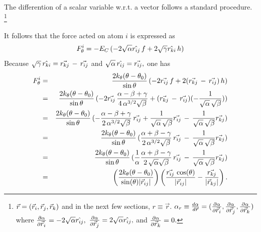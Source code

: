 The differention of a scalar variable w.r.t. a vector follows a
standard procedure.
\footnote{
$\vec{r} = (\mbox{$\vec{r}_{i}$},\mbox{$\vec{r}_{j}$},\mbox{$\vec{r}_{k}$})$ and in the next few sections, $r 
\equiv \vec{r}.$
$\alpha_{r} \equiv \frac{d\alpha}{d\vec{r}} =
(\frac{\partial\alpha}{\partial\mbox{$\vec{r}_{i}$}},\frac{\partial\alpha}{\partial\mbox{$\vec{r}_{j}$}},\frac{\partial\alpha}{\partial\mbox{$\vec{r}_{k}$}}) $
where 
$\frac{\partial\alpha}{\partial\mbox{$\vec{r}_{i}$}} = -2 \sqrt{\alpha} \mbox{$\hat{{r}_{ij}}$},$
$\frac{\partial\alpha}{\partial\mbox{$\vec{r}_{j}$}} =  2 \sqrt{\alpha} \mbox{$\hat{{r}_{ij}}$},$
and $\frac{\partial\alpha}{\partial\mbox{$\vec{r}_{k}$}} = 0.$}


It follows that the force acted on atom $i$ is expressed as
\begin{equation}
F_{\theta}^{i} = - E_C\,(-2 \sqrt{\alpha} \mbox{$\hat{{r}_{ij}}$} \, f +
2 \sqrt{\gamma} \mbox{$\hat{{r}_{ki}}$} \, h) 
\end{equation}
Because $\sqrt{\gamma} \, \mbox{$\hat{{r}_{ki}}$} = \vec{r_{kj}}\,- \, \vec{r_{ij}}$ 
and $\sqrt{\alpha} \, \mbox{$\hat{{r}_{ij}}$} = \vec{r_{ij}},$
one has
\begin{eqnarray}
F_{\theta}^{i} &=& \frac{2 k_{\theta} (\theta - \theta_0)}{\sin\theta}\,
(-2 \vec{r_{ij}} \, f +
2 (\vec{r_{kj}}\,- \, \vec{r_{ij}}) \, h)\nonumber \\
&=&  \frac{2 k_{\theta} (\theta - \theta_0)}{\sin\theta}\,
(-2 \vec{r_{ij}}\, \frac{\alpha - \beta + \gamma} 
{4\,\alpha^{3/2}\sqrt{\beta}} +
(\vec{r_{kj}}\,- \, \vec{r_{ij}}) (-\frac{1}{\sqrt{\alpha}\,
\sqrt{\beta}})) \nonumber \\
&=&  \frac{2 k_{\theta} (\theta - \theta_0)}{\sin\theta}\,
(- \frac{\alpha - \beta + \gamma} 
{2\,\alpha^{3/2}\sqrt{\beta}}\,\vec{r_{ij}} +
\frac{1}{\sqrt{\alpha}\,
\sqrt{\beta}}  \vec{r_{ij}} \,-\,\frac{1}{\sqrt{\alpha}\,
\sqrt{\beta}}  \vec{r_{kj}})\nonumber \\
&=&  \frac{2 k_{\theta} (\theta - \theta_0)}{\sin\theta}\,
(\frac{\alpha + \beta - \gamma} 
{2\,\alpha^{3/2}\sqrt{\beta}}\,\vec{r_{ij}} \,-\,\frac{1}{\sqrt{\alpha}\,
\sqrt{\beta}}  \vec{r_{kj}})\nonumber \\
&=&  \frac{2 k_{\theta} (\theta - \theta_0)}{\sin\theta}\,
(\frac{1}{\alpha} \frac{\alpha + \beta - \gamma} 
{2\,\sqrt{\alpha} \sqrt{\beta}}\,\vec{r_{ij}} \,-\,\frac{1}{\sqrt{\alpha}\,
\sqrt{\beta}}  \vec{r_{kj}})\nonumber \\
& = & \left(\frac{ 2k_{\theta}(\theta - \theta_0) }{ \sin(\theta) \mbox{$\left| \vec{r}_{ij} \right| $}
} \right) \left( \frac{ \vec{r_{ij}} \, \cos(\theta) }{ \mbox{$\left| \vec{r}_{ij} \right| $} } -
\frac{\vec{r_{kj}}}{\mbox{$\left| \vec{r}_{kj} \right| $} } \right).
\end{eqnarray}


